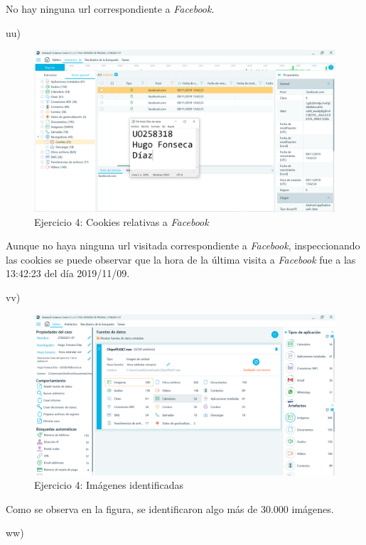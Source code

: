 \documentclass[11pt]{article}
\begin{document}
No hay ninguna url correspondiente a \textit{Facebook}.

uu)

\begin{figure}[H]
    \caption{Ejercicio 4: Cookies relativas a \textit{Facebook}}
    \centering
    \includegraphics[scale=0.4]{p04/e7-12.PNG}
\end{figure}

Aunque no haya ninguna url visitada correspondiente a \textit{Facebook}, inspeccionando las cookies se puede observar que la hora de la última visita a \textit{Facebook} fue a las 13:42:23 del día 2019/11/09.

vv)

\begin{figure}[H]
    \caption{Ejercicio 4: Imágenes identificadas}
    \centering
    \includegraphics[scale=0.4]{p04/e7-13.PNG}
\end{figure}

Como se observa en la figura, se identificaron algo más de 30.000 imágenes.

ww)
\end{document}
